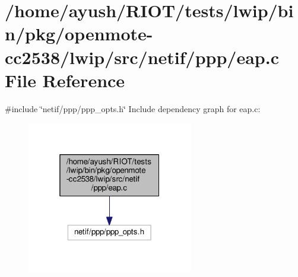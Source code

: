 \hypertarget{openmote-cc2538_2lwip_2src_2netif_2ppp_2eap_8c}{}\section{/home/ayush/\+R\+I\+O\+T/tests/lwip/bin/pkg/openmote-\/cc2538/lwip/src/netif/ppp/eap.c File Reference}
\label{openmote-cc2538_2lwip_2src_2netif_2ppp_2eap_8c}
{\ttfamily \#include \char`\"{}netif/ppp/ppp\+\_\+opts.\+h\char`\"{}}\newline
Include dependency graph for eap.\+c\+:
\nopagebreak
\begin{figure}[H]
\begin{center}
\leavevmode
\includegraphics[width=205pt]{openmote-cc2538_2lwip_2src_2netif_2ppp_2eap_8c__incl}
\end{center}
\end{figure}

